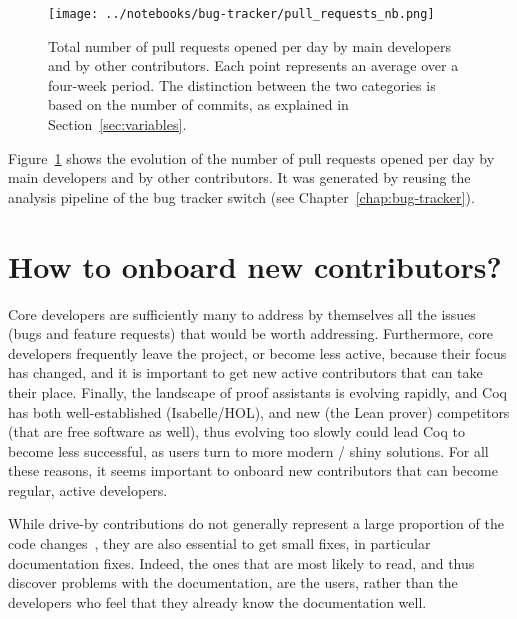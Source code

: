 \begin{figure}
	\begin{center}
		\texttt{[image: ../notebooks/bug-tracker/pull\_requests\_nb.png]}
		\caption{
			Total number of pull requests opened per day by main developers and by other contributors.
			Each point represents an average over a four-week period.
			The distinction between the two categories is based on the number of commits, as explained in Section~\ref{sec:variables}.
		}
		\label{fig:pull_request_nb}
	\end{center}
\end{figure}

Figure~\ref{fig:pull_request_nb} shows the evolution of the number of pull requests opened per day by main developers and by other contributors.
It was generated by reusing the analysis pipeline of the bug tracker switch (see Chapter~\ref{chap:bug-tracker}).

\section{How to onboard new contributors?}

\label{sec:newcomers}

Core developers are sufficiently many to address by themselves all the issues (bugs and feature requests) that would be worth addressing.
Furthermore, core developers frequently leave the project, or become less active, because their focus has changed, and it is important to get new active contributors that can take their place.
Finally, the landscape of proof assistants is evolving rapidly, and Coq has both well-established (Isabelle/HOL), and new (the Lean prover) competitors (that are free software as well), thus evolving too slowly could lead Coq to become less successful, as users turn to more modern / shiny solutions.
For all these reasons, it seems important to onboard new contributors that can become regular, active developers.

While drive-by contributions do not generally represent a large proportion of the code changes~\cite{robles2009evolution}, they are also essential to get small fixes, in particular documentation fixes. Indeed, the ones that are most likely to read, and thus discover problems with the documentation, are the users, rather than the developers who feel that they already know the documentation well.

